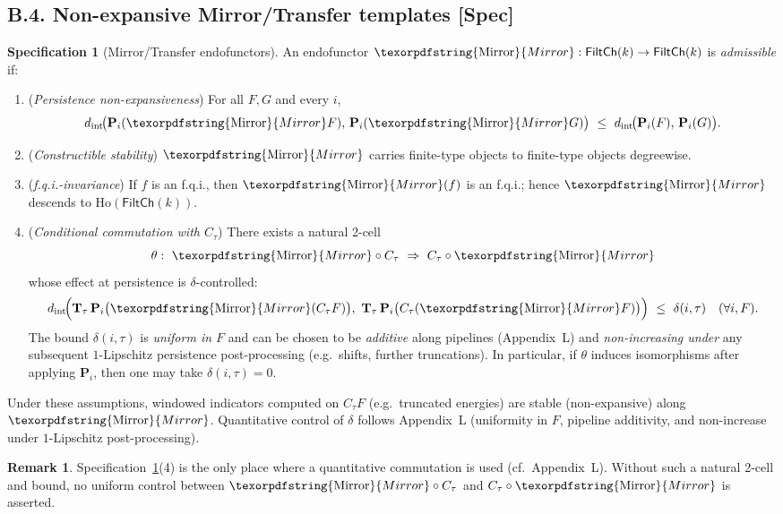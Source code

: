 \documentclass[11pt]{article}
\DeclareRobustCommand{\hyp}{\nobreakdash-}
\newcommand{\Ho}{\mathrm{Ho}}
\numberwithin{equation}{section}
\theoremstyle{definition}
\newtheorem{remark}[theorem]{Remark}
\newtheorem{specification}[theorem]{Specification}
\DeclareRobustCommand{\Mirror}{\texorpdfstring{\ensuremath{\operatorname{Mirror}}}{Mirror}}
\begin{document}
\subsection*{B.4. Non-expansive Mirror/Transfer templates \texorpdfstring{[Spec]}{[Spec]}}
\begin{specification}[Mirror/Transfer endofunctors]\label{B:spec:mirror}
An endofunctor \(\Mirror:\mathsf{FiltCh}(k)\to \mathsf{FiltCh}(k)\) is \emph{admissible} if:
\begin{enumerate}\itemsep0.2em
  \item (\emph{Persistence non-expansiveness})
  For all \(F,G\) and every \(i\),
  \[
  d_{\mathrm{int}}\!\big(\mathbf{P}_i(\Mirror F),\,\mathbf{P}_i(\Mirror G)\big)\ \le\ d_{\mathrm{int}}\!\big(\mathbf{P}_i(F),\,\mathbf{P}_i(G)\big).
  \]
  \item (\emph{Constructible stability})
  \(\Mirror\) carries finite-type objects to finite-type objects degreewise.
  \item (\emph{f.q.i.-invariance})
  If \(f\) is an f.q.i., then \(\Mirror(f)\) is an f.q.i.; hence \(\Mirror\) descends to \(\Ho(\mathsf{FiltCh}(k))\).
  \item (\emph{Conditional commutation with \(C_\tau\)})
  There exists a natural 2-cell
  \[
  \theta:\ \Mirror\circ C_\tau\ \Rightarrow\ C_\tau\circ \Mirror
  \]
  whose effect at persistence is \(\delta\)-controlled:
  \[
  d_{\mathrm{int}}\!\Big(\mathbf{T}_\tau\,\mathbf{P}_i\big(\Mirror(C_\tau F)\big),\ \mathbf{T}_\tau\,\mathbf{P}_i\big(C_\tau(\Mirror F)\big)\Big)\ \le\ \delta(i,\tau)\quad(\forall i,F).
  \]
  The bound \(\delta(i,\tau)\) is \emph{uniform in \(F\)} and can be chosen to be \emph{additive} along pipelines (Appendix~L) and \emph{non-increasing under} any subsequent \(1\)\hyp Lipschitz persistence post\hyp processing (e.g.\ shifts, further truncations).
  In particular, if \(\theta\) induces isomorphisms after applying \(\mathbf{P}_i\), then one may take \(\delta(i,\tau)=0\).
\end{enumerate}
Under these assumptions, windowed indicators computed on \(C_\tau F\) (e.g.\ truncated energies) are stable (non-expansive) along \(\Mirror\).
Quantitative control of \(\delta\) follows Appendix~L (uniformity in \(F\), pipeline additivity, and non-increase under \(1\)\hyp Lipschitz post\hyp processing).
\end{specification}

\begin{remark}
Specification~\ref{B:spec:mirror}(4) is the only place where a quantitative commutation is used (cf.\ Appendix~L).
Without such a natural 2-cell and bound, no uniform control between \(\Mirror\circ C_\tau\) and \(C_\tau\circ \Mirror\) is asserted.
\end{remark}
\end{document}
